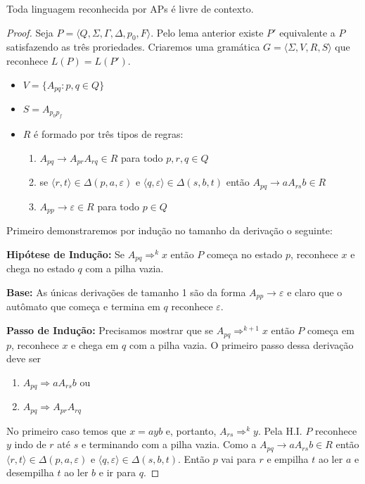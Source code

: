 \begin{theorem}
  Toda linguagem reconhecida por APs é livre de contexto.
\end{theorem}
\begin{proof}
  Seja $P = \langle Q, \Sigma, \Gamma, \Delta, p_0, F \rangle$.
  Pelo lema anterior existe $P'$ equivalente a $P$ satisfazendo as três proriedades.
Criaremos uma gramática $G = \langle \Sigma, V, R, S \rangle$ que reconhece $L(P) = L(P')$.

\begin{itemize}
\item $V = \{A_{pq} : p, q \in Q\}$
\item $S = A_{p_0p_f}$
\item $R$ é formado por três tipos de regras:
\begin{enumerate}
\item $A_{pq} \to A_{pr} A_{rq} \in R$ para todo $p,r,q \in Q$
\item se $\langle r, t \rangle \in \Delta(p, a, \varepsilon)$ e $\langle q, \varepsilon \rangle \in \Delta(s, b, t)$ então $A_{pq} \to a A_{rs} b \in R$
\item $A_{pp} \to \varepsilon \in R$ para todo $p \in Q$
\end{enumerate}
\end{itemize}

Primeiro demonstraremos por indução no tamanho da derivação o seguinte:

{\bf Hipótese de Indução:} Se $A_{pq} \Rightarrow^k x$ então $P$ começa no estado $p$, reconhece $x$ e chega no estado $q$ com a pilha vazia.

{\bf Base:} As únicas derivações de tamanho 1 são da forma $A_{pp} \to \varepsilon$ e claro que o autômato que começa e termina em $q$ reconhece $\varepsilon$.

{\bf Passo de Indução:} Precisamos mostrar que se $A_{pq} \Rightarrow^{k+1} x$ então $P$ começa em $p$, reconhece $x$ e chega em $q$ com a pilha vazia.
O primeiro passo dessa derivação deve ser
\begin{enumerate}
\item $A_{pq} \Rightarrow a A_{rs} b$ ou
\item $A_{pq} \Rightarrow A_{pr} A_{rq}$
\end{enumerate}

No primeiro caso temos que $x = ayb$ e, portanto, $A_{rs} \Rightarrow^k y$.
Pela H.I. $P$ reconhece $y$ indo de $r$ até $s$ e terminando com a pilha vazia.
Como a $A_{pq} \to a A_{rs} b \in R$ então $\langle r, t \rangle \in \Delta(p, a, \varepsilon)$ e $\langle q, \varepsilon \rangle \in \Delta(s, b, t)$.
Então $p$ vai para $r$ e empilha $t$ ao ler $a$ e desempilha $t$ ao ler $b$ e ir para $q$.


\end{proof}
